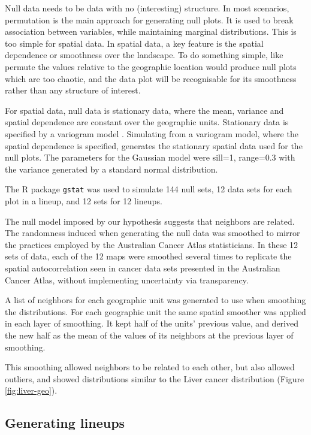 \documentclass{monashthesis}
\begin{document}
Null data needs to be data with no (interesting) structure. In most scenarios, permutation is the main approach for generating null plots. It is used to break association between variables, while maintaining marginal distributions. This is too simple for spatial data. In spatial data, a key feature is the spatial dependence or smoothness over the landscape. To do something simple, like permute the values relative to the geographic location would produce null plots which are too chaotic, and the data plot will be recognisable for its smoothness rather than any structure of interest.

For spatial data, null data is stationary data, where the mean, variance and spatial dependence are constant over the geographic units. Stationary data is specified by a variogram model \autocite{POG}. Simulating from a variogram model, where the spatial dependence is specified, generates the stationary spatial data used for the null plots. The parameters for the Gaussian model were sill=1, range=0.3 with the variance generated by a standard normal distribution.

The R package \texttt{gstat} \autocite{gstat} was used to simulate 144 null sets, 12 data sets for each plot in a lineup, and 12 sets for 12 lineups.

The null model imposed by our hypothesis suggests that neighbors are related. The randomness induced when generating the null data was smoothed to mirror the practices employed by the Australian Cancer Atlas statisticians.
In these 12 sets of data, each of the 12 maps were smoothed several times to replicate the spatial autocorrelation seen in cancer data sets presented in the Australian Cancer Atlas, without implementing uncertainty via transparency.

A list of neighbors for each geographic unit was generated to use when smoothing the distributions. For each geographic unit the same spatial smoother was applied in each layer of smoothing. It kept half of the units' previous value, and derived the new half as the mean of the values of its neighbors at the previous layer of smoothing.

This smoothing allowed neighbors to be related to each other, but also allowed outliers, and showed distributions similar to the Liver cancer distribution (Figure \ref{fig:liver-geo}).

\hypertarget{generating-lineups}{%
\subsection{Generating lineups}\label{generating-lineups}}
\end{document}
